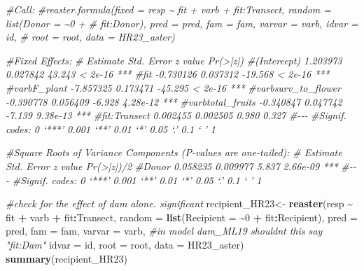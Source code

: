\documentclass[
]{article}
\newenvironment{Shaded}{\begin{snugshade}}{\end{snugshade}}
\newcommand{\AttributeTok}[1]{\textcolor[rgb]{0.13,0.29,0.53}{#1}}
\newcommand{\CommentTok}[1]{\textcolor[rgb]{0.56,0.35,0.01}{\textit{#1}}}
\newcommand{\DecValTok}[1]{\textcolor[rgb]{0.00,0.00,0.81}{#1}}
\newcommand{\FunctionTok}[1]{\textcolor[rgb]{0.13,0.29,0.53}{\textbf{#1}}}
\newcommand{\NormalTok}[1]{#1}
\newcommand{\OtherTok}[1]{\textcolor[rgb]{0.56,0.35,0.01}{#1}}
\newcommand{\SpecialCharTok}[1]{\textcolor[rgb]{0.81,0.36,0.00}{\textbf{#1}}}
\begin{document}
\begin{Shaded}
\begin{Highlighting}[]
\CommentTok{\#Call:}
\CommentTok{\#reaster.formula(fixed = resp \textasciitilde{} fit + varb + fit:Transect, random = list(Donor = \textasciitilde{}0 + }
\CommentTok{\#    fit:Donor), pred = pred, fam = fam, varvar = varb, idvar = id, }
\CommentTok{\#    root = root, data = HR23\_aster)}


\CommentTok{\#Fixed Effects:}
\CommentTok{\#                    Estimate Std. Error z value Pr(\textgreater{}|z|)    }
\CommentTok{\#(Intercept)         1.203973   0.027842  43.243  \textless{} 2e{-}16 ***}
\CommentTok{\#fit                {-}0.730126   0.037312 {-}19.568  \textless{} 2e{-}16 ***}
\CommentTok{\#varbF\_plant        {-}7.857325   0.173471 {-}45.295  \textless{} 2e{-}16 ***}
\CommentTok{\#varbsurv\_to\_flower {-}0.390778   0.056409  {-}6.928 4.28e{-}12 ***}
\CommentTok{\#varbtotal\_fruits   {-}0.340847   0.047742  {-}7.139 9.38e{-}13 ***}
\CommentTok{\#fit:Transect        0.002455   0.002505   0.980    0.327    }
\CommentTok{\#{-}{-}{-}}
\CommentTok{\#Signif. codes:  0 ‘***’ 0.001 ‘**’ 0.01 ‘*’ 0.05 ‘.’ 0.1 ‘ ’ 1}

\CommentTok{\#Square Roots of Variance Components (P{-}values are one{-}tailed):}
\CommentTok{\#      Estimate Std. Error z value Pr(\textgreater{}|z|)/2    }
\CommentTok{\#Donor 0.058235   0.009977   5.837   2.66e{-}09 ***}
\CommentTok{\#{-}{-}{-}}
\CommentTok{\#Signif. codes:  0 ‘***’ 0.001 ‘**’ 0.01 ‘*’ 0.05 ‘.’ 0.1 ‘ ’ 1}

\CommentTok{\#check for the effect of dam alone. significant  }
\NormalTok{recipient\_HR23}\OtherTok{\textless{}{-}} \FunctionTok{reaster}\NormalTok{(resp }\SpecialCharTok{\textasciitilde{}}\NormalTok{ fit }\SpecialCharTok{+}\NormalTok{ varb }\SpecialCharTok{+}\NormalTok{ fit}\SpecialCharTok{:}\NormalTok{Transect, }\AttributeTok{random =} \FunctionTok{list}\NormalTok{(}\AttributeTok{Recipient =} \SpecialCharTok{\textasciitilde{}}\DecValTok{0} \SpecialCharTok{+} 
\NormalTok{    fit}\SpecialCharTok{:}\NormalTok{Recipient), }\AttributeTok{pred =}\NormalTok{ pred, }\AttributeTok{fam =}\NormalTok{ fam, }\AttributeTok{varvar =}\NormalTok{ varb, }\CommentTok{\#in model dam\_ML19 shouldn\textquotesingle{}t this say "fit:Dam"}
    \AttributeTok{idvar =}\NormalTok{ id, }\AttributeTok{root =}\NormalTok{ root, }\AttributeTok{data =}\NormalTok{ HR23\_aster)}
\FunctionTok{summary}\NormalTok{(recipient\_HR23)}
\end{Highlighting}
\end{Shaded}
\end{document}
